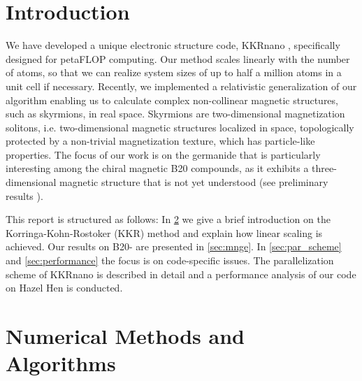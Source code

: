 \documentclass[graybox]{svmult}
\begin{document}
\section{Introduction}
\label{sec:intro}
We have developed a unique electronic structure code, 
KKRnano \cite{zeller_towards_2008,thiess_massively_2012},
specifically designed for petaFLOP computing. Our method scales linearly
with the number of atoms, so that we can realize system sizes of up to 
half a million atoms in a unit cell if necessary.
Recently, we implemented a relativistic generalization of our algorithm 
enabling us to calculate complex non-collinear magnetic structures, such as skyrmions,
in real space. Skyrmions are two-dimensional magnetization solitons, i.e. two-dimensional
magnetic structures localized in space, topologically protected by a non-trivial
magnetization texture, which has particle-like properties. 
The focus of our work is on the germanide  that is particularly
interesting among the chiral magnetic B20 compounds, as it exhibits a three-dimensional magnetic structure
that is not yet understood (see preliminary results
\cite{tanigaki_real-space_2015,rybakov_new_2016,bornemann_investigation_2017}).

This report is structured as follows:
In \cref{sec:methods_algorithms} we give a brief introduction on the Korringa-Kohn-Rostoker (KKR) 
method and explain how
linear scaling is achieved.
Our results on B20- are presented in \cref{sec:mnge}.
In \cref{sec:par_scheme} and \cref{sec:performance} the focus is on code-specific issues. 
The parallelization scheme of KKRnano
is described in detail and a performance analysis of our code on Hazel Hen is conducted.


\section{Numerical Methods and Algorithms}
\label{sec:methods_algorithms}
 
\end{document}
